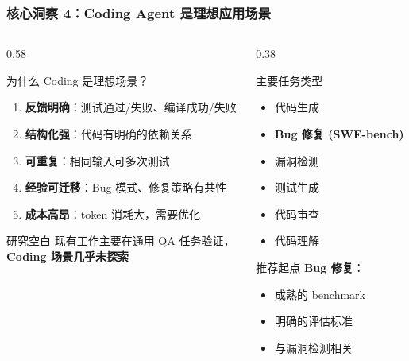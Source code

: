 \documentclass[aspectratio=169,10pt]{beamer}
\begin{document}
\begin{frame}
  \frametitle{核心洞察 4：Coding Agent 是理想应用场景}

  \begin{columns}[T]
    \begin{column}{0.58\textwidth}
      \begin{block}{为什么 Coding 是理想场景？}
        \footnotesize
        \begin{enumerate}
          \item \textbf{反馈明确}：测试通过/失败、编译成功/失败
          \item \textbf{结构化强}：代码有明确的依赖关系
          \item \textbf{可重复}：相同输入可多次测试
          \item \textbf{经验可迁移}：Bug 模式、修复策略有共性
          \item \textbf{成本高昂}：token 消耗大，需要优化
        \end{enumerate}
      \end{block}

      \begin{alertblock}{研究空白}
        \small
        现有工作主要在通用 QA 任务验证，\\
        \textbf{Coding 场景几乎未探索}
      \end{alertblock}
    \end{column}

    \begin{column}{0.38\textwidth}
      \begin{block}{主要任务类型}
        \footnotesize
        \begin{itemize}
          \item 代码生成
          \item \textbf{Bug 修复 (SWE-bench)}
          \item 漏洞检测
          \item 测试生成
          \item 代码审查
          \item 代码理解
        \end{itemize}
      \end{block}

      \vspace{0.2cm}

      \begin{block}{推荐起点}
        \footnotesize
        \textbf{Bug 修复}：
        \begin{itemize}
          \item 成熟的 benchmark
          \item 明确的评估标准
          \item 与漏洞检测相关
        \end{itemize}
      \end{block}
    \end{column}
  \end{columns}
\end{frame}
\end{document}
